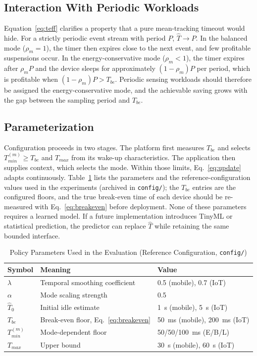 \documentclass[journal]{IEEEtran}
\begin{document}
\subsection{Interaction With Periodic Workloads}
Equation~\eqref{eq:teff} clarifies a property that a pure mean-tracking timeout would hide. For a strictly periodic event stream with period $P$, $\hat T\to P$. In the balanced mode ($\rho_m=1$), the timer then expires close to the next event, and few profitable suspensions occur. In the energy-conservative mode ($\rho_m<1$), the timer expires after $\rho_m P$ and the device sleeps for approximately $(1-\rho_m)P$ per period, which is profitable when $(1-\rho_m)P>T_{be}$. Periodic sensing workloads should therefore be assigned the energy-conservative mode, and the achievable saving grows with the gap between the sampling period and $T_{be}$.

\subsection{Parameterization}
Configuration proceeds in two stages. The platform first measures $T_{be}$ and selects $T_{min}^{(m)}\ge T_{be}$ and $T_{max}$ from its wake-up characteristics. The application then supplies context, which selects the mode. Within those limits, Eq.~\eqref{eq:update} adapts continuously. Table~\ref{tab:params} lists the parameters and the reference-configuration values used in the experiments (archived in \texttt{config/}); the $T_{be}$ entries are the configured floors, and the true break-even time of each device should be re-measured with Eq.~\eqref{eq:breakeven} before deployment. None of these parameters requires a learned model. If a future implementation introduces TinyML or statistical prediction, the predictor can replace $\hat T$ while retaining the same bounded interface.

\begin{table}[t]
\caption{Policy Parameters Used in the Evaluation (Reference Configuration, \texttt{config/})}
\label{tab:params}
\centering
\scriptsize
\setlength{\tabcolsep}{3pt}
\begin{tabular}{p{}p{}p{}}
\toprule
Symbol & Meaning & Value \\
\midrule
$\lambda$ & Temporal smoothing coefficient & 0.5 (mobile), 0.7 (IoT) \\
$\alpha$ & Mode scaling strength & 0.5 \\
$\hat T_0$ & Initial idle estimate & 1~s (mobile), 5~s (IoT) \\
$T_{be}$ & Break-even floor, Eq.~\eqref{eq:breakeven} & 50~ms (mobile), 200~ms (IoT) \\
$T_{min}^{(m)}$ & Mode-dependent floor & 50/50/100~ms (E/B/L) \\
$T_{max}$ & Upper bound & 30~s (mobile), 60~s (IoT) \\
\bottomrule
\end{tabular}
\end{table}
\end{document}
